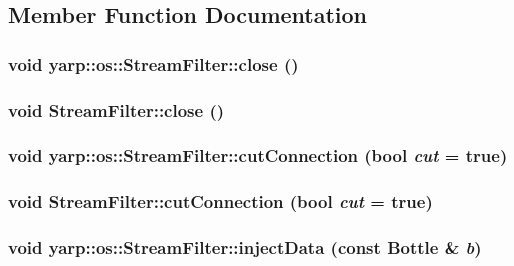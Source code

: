 \subsection{Member Function Documentation}
\hypertarget{classyarp_1_1os_1_1_stream_filter_aaa31b9321ff08b6122a037b3d721e2d4}{
\subsubsection[{close}]{\setlength{\rightskip}{0pt plus 5cm}void yarp::os::StreamFilter::close ()}}
\label{classyarp_1_1os_1_1_stream_filter_aaa31b9321ff08b6122a037b3d721e2d4}
\hypertarget{classyarp_1_1os_1_1_stream_filter_a833b30281a0c6039cdfcded6986fe36e}{
\subsubsection[{close}]{\setlength{\rightskip}{0pt plus 5cm}void StreamFilter::close ()}}
\label{classyarp_1_1os_1_1_stream_filter_a833b30281a0c6039cdfcded6986fe36e}
\hypertarget{classyarp_1_1os_1_1_stream_filter_a1f9ef00b6c094c9489121143a4e38c77}{
\subsubsection[{cutConnection}]{\setlength{\rightskip}{0pt plus 5cm}void yarp::os::StreamFilter::cutConnection (bool {\em cut} = {\ttfamily true})}}
\label{classyarp_1_1os_1_1_stream_filter_a1f9ef00b6c094c9489121143a4e38c77}
\hypertarget{classyarp_1_1os_1_1_stream_filter_a3c72e672f88e6f9e8d77f7af8bcd31ee}{
\subsubsection[{cutConnection}]{\setlength{\rightskip}{0pt plus 5cm}void StreamFilter::cutConnection (bool {\em cut} = {\ttfamily true})}}
\label{classyarp_1_1os_1_1_stream_filter_a3c72e672f88e6f9e8d77f7af8bcd31ee}
\hypertarget{classyarp_1_1os_1_1_stream_filter_a86214ed7527aca2157153c2ee3899afd}{
\subsubsection[{injectData}]{\setlength{\rightskip}{0pt plus 5cm}void yarp::os::StreamFilter::injectData (const Bottle \& {\em b})}}
